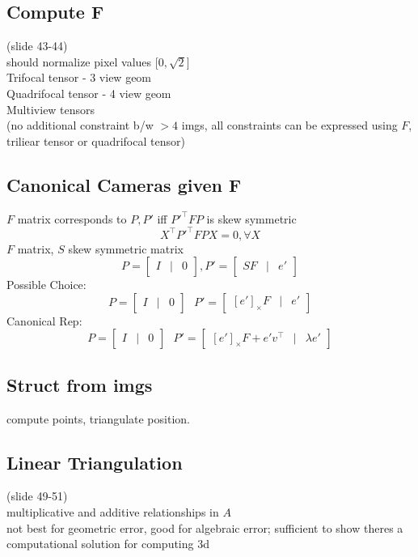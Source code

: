 \documentclass{article}
\begin{document}
\subsection{Compute F}
(slide 43-44)
\\
should normalize pixel values [$0,\sqrt2$]
\\
Trifocal tensor - 3 view geom\\
Quadrifocal tensor - 4 view geom\\
Multiview tensors\\
(no additional constraint b/w $>4$ imgs, all constraints can be expressed
using $F$, triliear tensor or quadrifocal tensor)


\subsection{Canonical Cameras given F}
$F$ matrix corresponds to $P, P'$ iff $P'^\top FP$ is skew symmetric
\[
    X^\top P'^\top FPX = 0, \forall X
\]
$F$ matrix, $S$ skew symmetric matrix
\[
    P = \begin{bmatrix}
        I & | & 0
    \end{bmatrix}, P' = \begin{bmatrix}
        SF & | & e'
    \end{bmatrix}
\]
Possible Choice:
\[
    P = \begin{bmatrix}
        I & | & 0
    \end{bmatrix} \ \ \ P' = \begin{bmatrix}
        [e']_\times F & | & e'
    \end{bmatrix}
\]
Canonical Rep:
\[
    P = \begin{bmatrix}
        I & | & 0
    \end{bmatrix} \ \ \ P' = \begin{bmatrix}
        [e']_\times F + e'v^\top & | & \lambda e'
    \end{bmatrix}
\]


\subsection{Struct from imgs}
compute points, triangulate position.

\subsection{Linear Triangulation}
(slide 49-51)\\
multiplicative and additive relationships in $A$
\\
not best for geometric error, good for algebraic error; 
sufficient to show theres a computational solution for computing 3d
\end{document}
